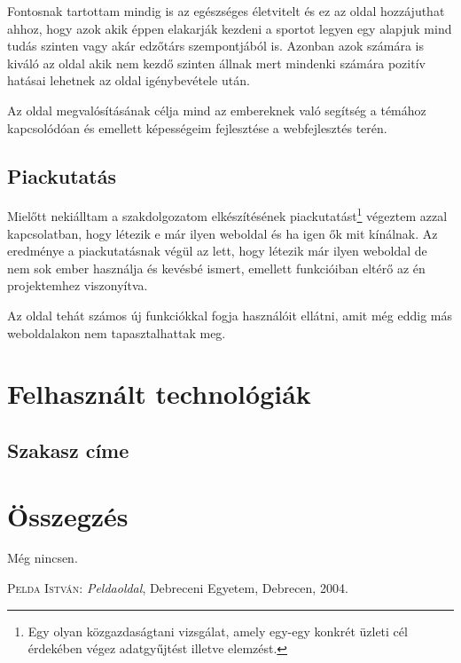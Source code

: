 \documentclass[
]{thesis-ekf}
\theoremstyle{definition}
\theoremstyle{remark}
\begin{document}
	Fontosnak tartottam mindig is az egészséges életvitelt és ez az oldal hozzájuthat ahhoz, hogy azok akik éppen elakarják kezdeni a sportot legyen egy alapjuk mind tudás szinten vagy akár edzőtárs szempontjából is. Azonban azok számára is kiváló az oldal akik nem kezdő szinten állnak mert mindenki számára pozitív hatásai lehetnek az oldal igénybevétele után.
	
	Az oldal megvalósításának célja mind az embereknek való segítség a témához kapcsolódóan és emellett képességeim fejlesztése a webfejlesztés terén.
	
	\section{Piackutatás}
	Mielőtt nekiálltam a szakdolgozatom elkészítésének piackutatást\footnote{Egy olyan közgazdaságtani vizsgálat, amely egy-egy konkrét üzleti cél érdekében végez adatgyűjtést illetve elemzést.} végeztem azzal kapcsolatban, hogy létezik e már ilyen weboldal és ha igen ők mit kínálnak. Az eredménye a piackutatásnak végül az lett, hogy létezik már ilyen weboldal de nem sok ember használja és kevésbé ismert, emellett funkcióiban eltérő az én projektemhez viszonyítva.
	
	Az oldal tehát számos új funkciókkal fogja használóit ellátni, amit még eddig más weboldalakon nem tapasztalhattak meg.
	
	\chapter{Felhasznált technológiák}
	\section{Szakasz címe}
	

	
	\chapter*{Összegzés}
	Még nincsen.
	
	\begin{thebibliography}{2}
		\textsc{Pelda István}: \emph{Peldaoldal}, Debreceni Egyetem, Debrecen, 2004.
	\end{thebibliography}
	
\end{document}

